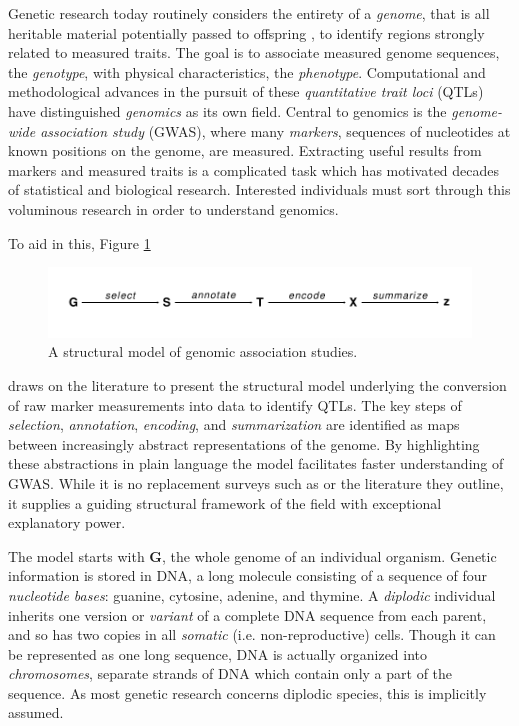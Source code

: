 \documentclass[sts]{imsart}
\newcommand{\m}[1]{\mathbf{#1}}               %
\begin{document}
Genetic research today routinely considers the entirety of a \emph{genome}, that is all heritable material potentially passed to offspring \cite{doergeetal1997search}, to identify regions strongly related to measured traits. The goal is to associate measured genome sequences, the \emph{genotype}, with physical characteristics, the \emph{phenotype}. Computational and methodological advances in the pursuit of these \emph{quantitative trait loci} (QTLs) have distinguished \emph{genomics} as its own field. Central to genomics is the \emph{genome-wide association study} (GWAS), where many \emph{markers}, sequences of nucleotides at known positions on the genome, are measured. Extracting useful results from markers and measured traits is a complicated task which has motivated decades of statistical and biological research. Interested individuals must sort through this voluminous research in order to understand genomics.

To aid in this, Figure \ref{fig:modelDiagram}
\begin{figure}[h]
  \begin{center}
  \includegraphics[scale = 1]{../img/modelDiagram.pdf}
  \caption{A structural model of genomic association
    studies.} \label{fig:modelDiagram}
  \end{center}
\end{figure}
draws on the literature to present the structural model underlying the conversion of raw marker measurements into data to identify QTLs. The key steps of \emph{selection}, \emph{annotation}, \emph{encoding}, and \emph{summarization} are identified as maps between increasingly abstract representations of the genome. By highlighting these abstractions in plain language the model facilitates faster understanding of GWAS. While it is no replacement surveys such as \cite{uffelmannetal2021gwas, tametal2019benefits} or the literature they outline, it supplies a guiding structural framework of the field with exceptional explanatory power.

The model starts with $\m{G}$, the whole genome of an individual organism. Genetic information is stored in DNA, a long molecule consisting of a sequence of four \emph{nucleotide bases}: guanine, cytosine, adenine, and thymine. A \emph{diplodic} individual inherits one version or \emph{variant} of a complete DNA sequence from each parent, and so has two copies in all \emph{somatic} (i.e. non-reproductive) cells. Though it can be represented as one long sequence, DNA is actually organized into \emph{chromosomes}, separate strands of DNA which contain only a part of the sequence. As most genetic research concerns diplodic species, this is implicitly assumed.
\end{document}
